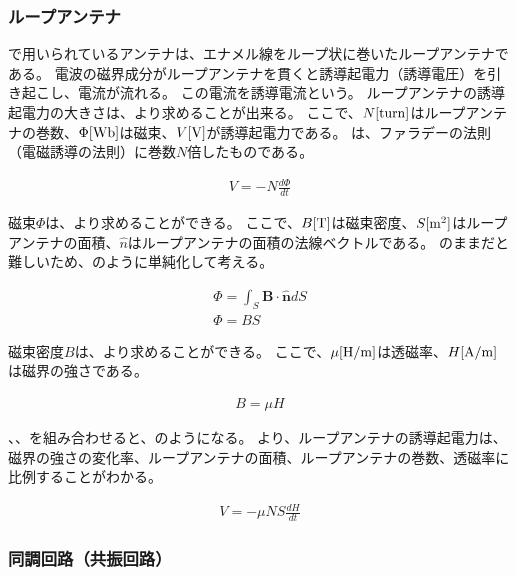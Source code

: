 \documentclass[report.tex]{subfiles}
\begin{document}
\subsubsection{ループアンテナ}

で用いられているアンテナは、エナメル線をループ状に巻いたループアンテナである。
電波の磁界成分がループアンテナを貫くと誘導起電力（誘導電圧）を引き起こし、電流が流れる\cite{ラジオ}。
この電流を誘導電流という。
ループアンテナの誘導起電力の大きさは、より求めることが出来る。
ここで、\(N[\rm{turn}]\)はループアンテナの巻数、\(\Phi[\rm{Wb}]\)は磁束、\(V[\rm{V}]\)が誘導起電力である。
は、ファラデーの法則（電磁誘導の法則）に巻数\(N\)倍したものである\cite{やくにたつ}。

\begin{align}
	V = -N \frac{d\Phi}{dt} \label{eq:induced-voltage}
\end{align}

磁束\(\Phi\)は、より求めることができる\cite{電磁気学}。
ここで、\(B[\rm{T}]\)は磁束密度、\(S[\rm{m^2}]\)はループアンテナの面積、\(\hat{n}\)はループアンテナの面積の法線ベクトルである。
のままだと難しいため、のように単純化して考える。

\begin{align}
	\Phi = \int_S \textbf{B} \cdot \hat{\textbf{n}} dS \label{eq:flux} \\
	\Phi = B S \label{eq:flux2}
\end{align}

磁束密度\(B\)は、より求めることができる。
ここで、\(\mu[\rm{H/m}]\)は透磁率、\(H[\rm{A/m}]\)は磁界の強さである\cite{やくにたつ}。

\begin{align}
	B = \mu H \label{eq:flux-density}
\end{align}

、、を組み合わせると、のようになる。
より、ループアンテナの誘導起電力は、磁界の強さの変化率、ループアンテナの面積、ループアンテナの巻数、透磁率に比例することがわかる。

\begin{align}
	V = -\mu N S \frac{dH}{dt} \label{eq:induced-voltage2}
\end{align}

\subsubsection{同調回路（共振回路）}
\end{document}
